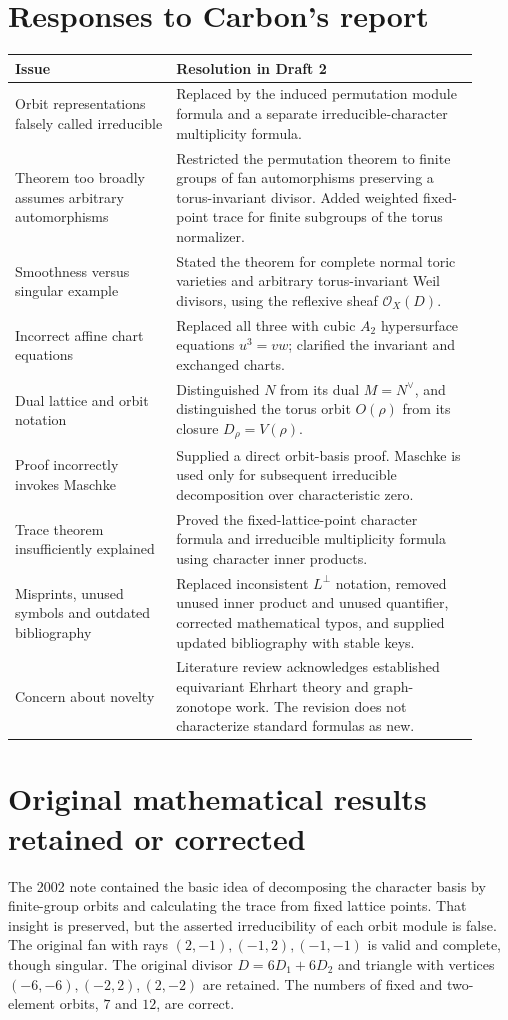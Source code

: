 \documentclass[12pt,letterpaper]{article}
\begin{document}
\section{Responses to Carbon's report}
\begin{longtable}{@{}>{\raggedright\arraybackslash}p{0.32\linewidth}>{\raggedright\arraybackslash}p{0.60\linewidth}@{}}
\toprule
Issue & Resolution in Draft 2\\\midrule
\endhead
Orbit representations falsely called irreducible & Replaced by the induced permutation module formula and a separate irreducible-character multiplicity formula.\\
Theorem too broadly assumes arbitrary automorphisms & Restricted the permutation theorem to finite groups of fan automorphisms preserving a torus-invariant divisor. Added weighted fixed-point trace for finite subgroups of the torus normalizer.\\
Smoothness versus singular example & Stated the theorem for complete normal toric varieties and arbitrary torus-invariant Weil divisors, using the reflexive sheaf $\mathcal O_X(D)$.\\
Incorrect affine chart equations & Replaced all three with cubic $A_2$ hypersurface equations $u^3=vw$; clarified the invariant and exchanged charts.\\
Dual lattice and orbit notation & Distinguished $N$ from its dual $M=N^\vee$, and distinguished the torus orbit $O(\rho)$ from its closure $D_\rho=V(\rho)$.\\
Proof incorrectly invokes Maschke & Supplied a direct orbit-basis proof. Maschke is used only for subsequent irreducible decomposition over characteristic zero.\\
Trace theorem insufficiently explained & Proved the fixed-lattice-point character formula and irreducible multiplicity formula using character inner products.\\
Misprints, unused symbols and outdated bibliography & Replaced inconsistent $L^\perp$ notation, removed unused inner product and unused quantifier, corrected mathematical typos, and supplied updated bibliography with stable keys.\\
Concern about novelty & Literature review acknowledges established equivariant Ehrhart theory and graph-zonotope work. The revision does not characterize standard formulas as new.\\
\bottomrule
\end{longtable}

\section{Original mathematical results retained or corrected}
The 2002 note contained the basic idea of decomposing the character basis by finite-group orbits and calculating the trace from fixed lattice points. That insight is preserved, but the asserted irreducibility of each orbit module is false. The original fan with rays $(2,-1),(-1,2),(-1,-1)$ is valid and complete, though singular. The original divisor $D=6D_1+6D_2$ and triangle with vertices $(-6,-6),(-2,2),(2,-2)$ are retained. The numbers of fixed and two-element orbits, $7$ and $12$, are correct.
\end{document}
